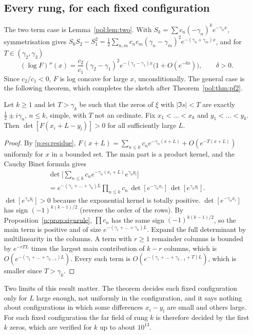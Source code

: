 \subsection{Every rung, for each fixed configuration}

The two term case is Lemma~\ref{pol:lem:two}. With $S_k=\sum c_n(-\gamma_n)^ke^{-\gamma_nx}$, symmetrisation gives $S_0S_2-S_1^2=\frac12\sum_{n,m}c_nc_m(\gamma_n-\gamma_m)^2e^{-(\gamma_n+\gamma_m)x}$, and for $T\in(\gamma_2,\gamma_3)$
\[
(\log F)''(x)=\frac{c_2}{c_1}(\gamma_2-\gamma_1)^2e^{-(\gamma_2-\gamma_1)x}\big(1+O(e^{-\delta x})\big),\qquad \delta>0 .
\]
Since $c_2/c_1<0$, $F$ is log concave for large $x$, unconditionally. The general case is the following theorem, which completes the sketch after Theorem~\ref{pol:thm:pf2}.

\begin{theorem}\label{p:thm:farpfk}
Let $k\ge1$ and let $T>\gamma_k$ be such that the zeros of $\xi$ with $|\Im s|<T$ are exactly $\frac12\pm i\gamma_n$, $n\le k$, simple, with $T$ not an ordinate. Fix $x_1<\dots<x_k$ and $y_1<\dots<y_k$. Then $\det[F(x_i+L-y_l)]>0$ for all sufficiently large $L$.
\end{theorem}

\begin{proof}
By \eqref{p:eq:residue}, $F(x+L)=\sum_{n\le k}c_ne^{-\gamma_n(x+L)}+O(e^{-T(x+L)})$ uniformly for $x$ in a bounded set. The main part is a product kernel, and the Cauchy Binet formula gives
\begin{multline*}
\det\Big[\sum_{n\le k}c_ne^{-\gamma_n(x_i+L)}e^{\gamma_ny_l}\Big]\\=e^{-(\gamma_1+\dots+\gamma_k)L}\prod_{n\le k}c_n\,\det[e^{-\gamma_nx_i}]\,\det[e^{\gamma_ny_l}].
\end{multline*}
$\det[e^{\gamma_ny_l}]>0$ because the exponential kernel is totally positive. $\det[e^{-\gamma_nx_i}]$ has sign $(-1)^{k(k-1)/2}$ (reverse the order of the rows). By Proposition~\ref{p:prop:signrule}, $\prod c_n$ has the same sign $(-1)^{k(k-1)/2}$, so the main term is positive and of size $e^{-(\gamma_1+\dots+\gamma_k)L}$. Expand the full determinant by multilinearity in the columns. A term with $r\ge1$ remainder columns is bounded by $e^{-rTL}$ times the largest main contribution of $k-r$ columns, which is $O(e^{-(\gamma_1+\dots+\gamma_{k-r})L})$. Every such term is $O(e^{-(\gamma_1+\dots+\gamma_{k-1}+T)L})$, which is smaller since $T>\gamma_k$.
\end{proof}

Two limits of this result matter. The theorem decides each fixed configuration only for $L$ large enough, not uniformly in the configuration, and it says nothing about configurations in which some differences $x_i-y_l$ are small and others large. For each fixed configuration the far field of rung $k$ is therefore decided by the first $k$ zeros, which are verified for $k$ up to about $10^{13}$.

